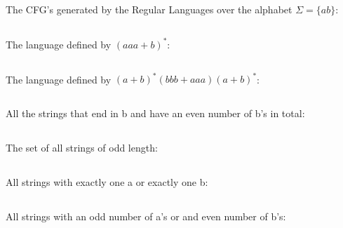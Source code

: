 \documentclass[12pt,a4paper,oneside]{report}
\begin{document}
\section{}
The CFG's generated by the Regular Languages over the alphabet $\Sigma = \{a b \}$:
\subsection{}
The language defined by $(aaa + b)^*$:
\subsection{}
The language defined by $(a + b)^*(bbb + aaa)(a + b)^*$:
\subsection{}
All the strings that end in b and have an even number of b's in total:
\subsection{}
The set of all strings of odd length:
\subsection{}
All strings with exactly one a or exactly one b:
\subsection{}
All strings with an odd number of a's or and even number of b's:
\end{document}
